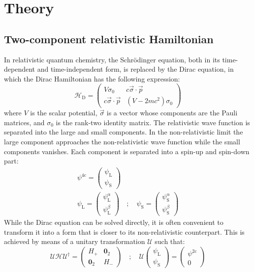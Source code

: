 \documentclass[12pt]{article}
\begin{document}
\section{Theory}

\subsection{Two-component relativistic Hamiltonian}
In relativistic quantum chemistry, the Schr{\"{o}}dinger equation, both in its time-dependent and time-independent form, is replaced by the Dirac equation, in which the Dirac Hamiltonian has the following expression:\cite{Dyall07_book,Reiher15_book}
\begin{equation}
 {\mathcal{H}}_\mathrm{D} = \begin{pmatrix} V \sigma_0 & c\vec{\sigma}\cdot\vec{p} \\ c\vec{\sigma}\cdot\vec{p} & (V - 2mc^2) \sigma_0 \end{pmatrix}
\label{eq:DiracH}
\end{equation}
where $V$ is the scalar potential, $\vec{\sigma}$ is a vector whose components are the Pauli matrices, and $\sigma_0$ is the rank-two identity matrix.
The relativistic wave function is separated into the large and small components. In the non-relativistic limit the large component approaches the non-relativistic wave function while the small components vanishes.
Each component is separated into a spin-up and spin-down part:
\begin{gather}
 \psi^\mathrm{4c} = \begin{pmatrix} \psi_\mathrm{L} \\ \psi_\mathrm{S} \end{pmatrix} \\
 \psi_\mathrm{L} = \begin{pmatrix} \psi_\mathrm{L}^\alpha \\ \psi_\mathrm{L}^\beta \end{pmatrix} \quad;\quad
 \psi_\mathrm{S} = \begin{pmatrix} \psi_\mathrm{S}^\alpha \\ \psi_\mathrm{S}^\beta \end{pmatrix}
\end{gather}
While the Dirac equation can be solved directly, it is often convenient to transform it into a form that is closer to its non-relativistic counterpart.
This is achieved by means of a unitary transformation $\mathcal{U}$ such that:
\begin{equation}
\label{eq:4cto2c}
 {\mathcal{U}} {\mathcal{H}}  {\mathcal{U}}^\dagger =
  \begin{pmatrix} {H}_+ & \mathbf{0}_2 \\ \mathbf{0}_2 & {H}_- \end{pmatrix} \quad;\quad 
 {\mathcal{U}} \begin{pmatrix} \psi_\mathrm{L} \\ \psi_\mathrm{S} \end{pmatrix} = \begin{pmatrix} \psi^\mathrm{2c} \\ 0 \end{pmatrix}
\end{equation}
\end{document}
